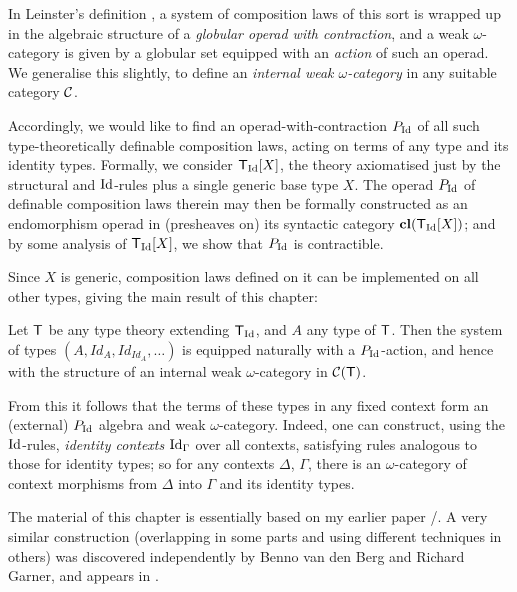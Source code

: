 \begin{para}In Leinster's definition \cite{leinster:book}, a system of composition laws of this sort is wrapped up in the algebraic structure of a \emph{globular operad with contraction}, and a weak $\omega$-category is given by a globular set equipped with an \emph{action} of such an operad.  We generalise this slightly, to define an \emph{internal weak $\omega$-category} in any suitable category $\mathcal{C}$.

Accordingly, we would like to find an operad-with-contraction $P_{\mathrm{Id}}$ of all such type-theoretically definable composition laws, acting on terms of any type and its identity types.  Formally, we consider $\mathsf{T}_{\mathrm{Id}}[X]$, the theory axiomatised just by the structural and $\mathrm{Id}$-rules plus a single generic base type $X$.  The operad $P_{\mathrm{Id}}$ of definable composition laws therein may then be formally constructed as an endomorphism operad in (presheaves on) its syntactic category $\mathbf{cl}(\mathsf{T}_{\mathrm{Id}} [X])$; and by some analysis of $\mathsf{T}_{\mathrm{Id}}[X]$, we show that $P_{\mathrm{Id}}$ is contractible.
\end{para}

Since $X$ is generic, composition laws defined on it can be implemented on all other types, giving the main result of this chapter:  

\begin{mainthmfund}Let $\mathsf{T}$ be any type theory extending $\mathsf{T}_{\mathrm{Id}}$, and $A$ any type of $\mathsf{T}$.  Then the system of types $(A, Id_A, Id_{Id_A}, \ldots)$ is equipped naturally with a $P_{\mathrm{Id}}$-action, and hence with the structure of an internal weak $\omega$-category in $\mathcal{C}(\mathsf{T})$.
\end{mainthmfund}

From this it follows that the terms of these types in any fixed context form an (external) $P_{\mathrm{Id}}$ algebra and weak $\omega$-category.  Indeed, one can construct, using the $\mathrm{Id}$-rules, \emph{identity contexts} $\mathrm{Id}_\Gamma$ over all contexts, satisfying rules analogous to those for identity types; so for any contexts $\Delta$, $\Gamma$, there is an $\omega$-category of context morphisms from $\Delta$ into $\Gamma$ and its identity types.

The material of this chapter is essentially based on my earlier paper \cite{lumsdaine:tlca-proceedings}/\cite{lumsdaine:weak-w-cats-from-itt-lmcs}.  A very similar construction (overlapping in some parts and using different techniques in others)  was discovered independently by Benno van den Berg and Richard Garner, and appears in \cite{garner-van-den-berg}. \\

